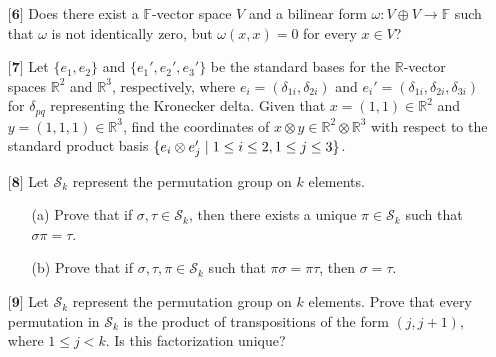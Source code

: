 \documentclass[12pt]{article}
\begin{document}
\begin{itemize}
    \vspace{.5cm}
    \item[$\textbf{[6]}$]
    Does there exist a $\mathbb{F}$-vector space $V$ and a bilinear form $\omega: V \oplus V \rightarrow \mathbb{F}$ such that $\omega$ is not identically zero, but $\omega(x,x) = 0$ for every $x \in V$?
    
    \vspace{.5cm}
    \item[$\textbf{[7]}$]
    Let $\{e_1,e_2\}$ and $\{e_1',e_2',e_3'\}$ be the standard bases for the $\mathbb{R}$-vector spaces $\mathbb{R}^2$ and $\mathbb{R}^3$, respectively, where \newline $e_i = (\delta_{1i},\delta_{2i})$ and $e_i' = (\delta_{1i},\delta_{2i},\delta_{3i})$ for $\delta_{pq}$ representing the Kronecker delta. Given that $x = (1,1) \in \mathbb{R}^2$ and $y = (1,1,1) \in \mathbb{R}^3$, find the coordinates of $x \otimes y \in \mathbb{R}^2 \otimes \mathbb{R}^3$ with respect to the standard product basis $\{e_i \otimes e_j' \hspace{.1cm} | \hspace{.1cm} 1 \leq i \leq 2, 1 \leq j \leq 3\}$. 
    
    \vspace{.5cm}
    \item[$\textbf{[8]}$]
    Let $\mathcal{S}_k$ represent the permutation group on $k$ elements. 
    \begin{itemize}
    
    \vspace{.3cm}
    \item[(a)]
    Prove that if $\sigma,\tau \in \mathcal{S}_k$, then there exists a unique $\pi \in \mathcal{S}_k$ such that $\sigma\pi = \tau$. 
    
    \vspace{.3cm}
    \item[(b)]
    Prove that if $\sigma,\tau,\pi \in \mathcal{S}_k$ such that $\pi\sigma = \pi\tau$, then $\sigma = \tau$. 
    
    \end{itemize}
    
    \vspace{.5cm}
    \item[$\textbf{[9]}$]
    Let $\mathcal{S}_k$ represent the permutation group on $k$ elements. Prove that every permutation in $\mathcal{S}_k$ is the product of transpositions of the form $(j,j+1)$, where $1 \leq j < k$. Is this factorization unique?
    

\end{itemize}
\end{document}
